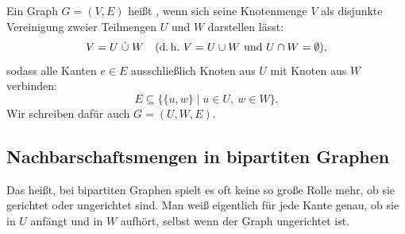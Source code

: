 \begin{math-stroke}
\begin{definition}\label{def:bipartiter-graph}
Ein Graph $G = (V, E)$ heißt , wenn sich seine Knotenmenge $V$ als disjunkte Vereinigung zweier Teilmengen $U$ und $W$ darstellen lässt:
\[
V = U \;\dot{\cup}\; W \quad (\text{d.\,h.\ } V = U \cup W \text{ und } U \cap W = \emptyset),
\]
sodass alle Kanten $e \in E$ ausschließlich Knoten aus $U$ mit Knoten aus $W$ verbinden:
\[
E \subseteq \{ \{u, w\} \mid u \in U, \ w \in W \}.
\]
Wir schreiben dafür auch $G = (U, W, E)$.
\end{definition}

\begin{center}
\end{center}
\end{math-stroke}

\subsection{Nachbarschaftsmengen in bipartiten Graphen}

\begin{spoken-clean}[00:55:02 - 00:56:41]
Das heißt, bei bipartiten Graphen spielt es oft keine so große Rolle mehr, ob sie gerichtet oder ungerichtet sind. Man weiß eigentlich für jede Kante genau, ob sie in $U$ anfängt und in $W$ aufhört, selbst wenn der Graph ungerichtet ist.
\end{spoken-clean}

